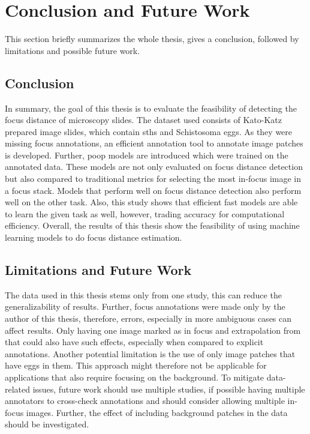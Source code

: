\chapter{Conclusion and Future Work}
\label{ch:Conclusion}

This section briefly summarizes the whole thesis, gives a conclusion, followed by limitations and possible future work.

\section{Conclusion}
\label{sec:Conclusion:Conclusion}

In summary, the goal of this thesis is to evaluate the feasibility of detecting the focus distance of microscopy slides. The dataset used consists of Kato-Katz prepared image slides, which contain \aclp{sth} and Schistosoma eggs. As they were missing focus annotations, an efficient annotation tool to annotate image patches is developed. Further, \ac{poop} models are introduced which were trained on the annotated data. These models are not only evaluated on focus distance detection but also compared to traditional metrics for selecting the most in-focus image in a focus stack. Models that perform well on focus distance detection also perform well on the other task. Also, this study shows that efficient fast models are able to learn the given task as well, however, trading accuracy for computational efficiency.
Overall, the results of this thesis show the feasibility of using machine learning models to do focus distance estimation.


\section{Limitations and Future Work}
\label{sec:Conclusion:FutureWork}

The data used in this thesis stems only from one study, this can reduce the generalizability of results. Further, focus annotations were made only by the author of this thesis, therefore, errors, especially in more ambiguous cases can affect results. Only having one image marked as in focus and extrapolation from that could also have such effects, especially when compared to explicit annotations. Another potential limitation is the use of only image patches that have eggs in them. This approach might therefore not be applicable for applications that also require focusing on the background. 
To mitigate data-related issues, future work should use multiple studies, if possible having multiple annotators to cross-check annotations and should consider allowing multiple in-focus images. Further, the effect of including background patches in the data should be investigated.

